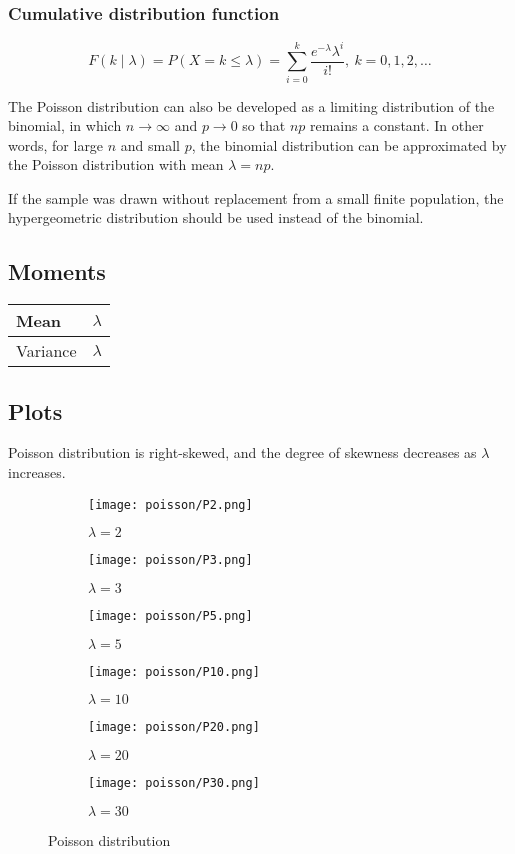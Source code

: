 \subsubsection{Cumulative distribution function}
\[
	F(k \mid \lambda) = P(X = k \leq \lambda) = \sum_{i = 0}^{k} \frac{e^{-\lambda} \lambda^i}{i!}, \ k = 0, 1, 2, \ldots
\]

The Poisson distribution can also be developed as a limiting distribution of the binomial, in which $n \rightarrow \infty$ and $p \rightarrow 0$ so that $np$ remains a constant. In other words, for large $n$ and small $p$, the binomial distribution can be approximated by the Poisson distribution with mean $\lambda = np$.

If the sample was drawn without replacement from a small finite population, the hypergeometric distribution should be used instead of the binomial.

\subsection{Moments}

\begin{tabular}{p{} p{}}
	\hline
	Mean & $\lambda$ \\\hline
	Variance & $\lambda$\\\hline
\end{tabular}

\subsection{Plots}
Poisson distribution is right-skewed, and the degree of skewness decreases as $\lambda$ increases.

\begin{figure}[H]
	\centering
	\begin{subfigure}[b]{0.45\textwidth}
		\texttt{[image: poisson/P2.png]}
		\caption{$\lambda = 2$}
		\label{fig:P2}
	\end{subfigure}
	\begin{subfigure}[b]{0.45\textwidth}
	\texttt{[image: poisson/P3.png]}
	\caption{$\lambda = 3$}
	\label{fig:P3}
	\end{subfigure}
	\begin{subfigure}[b]{0.45\textwidth}
		\texttt{[image: poisson/P5.png]}
		\caption{$\lambda = 5$}
		\label{fig:P5}
	\end{subfigure}
	\begin{subfigure}[b]{0.45\textwidth}
		\texttt{[image: poisson/P10.png]}
		\caption{$\lambda = 10$}
		\label{fig:P10}
	\end{subfigure}
	\begin{subfigure}[b]{0.45\textwidth}
		\texttt{[image: poisson/P20.png]}
		\caption{$\lambda = 20$}
		\label{fig:P20}
	\end{subfigure}
	\begin{subfigure}[b]{0.45\textwidth}
		\texttt{[image: poisson/P30.png]}
		\caption{$\lambda = 30$}
		\label{fig:P30}
	\end{subfigure}
	\caption{Poisson distribution}\label{fig:poisson}
\end{figure}
